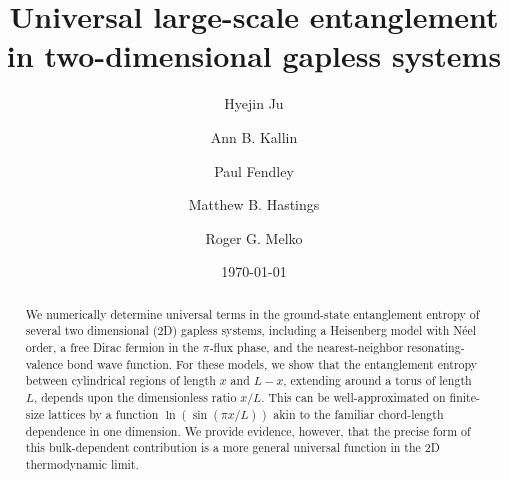\documentclass[prl,aps,twocolumn,floatfix,amsmath,amssymb,superscriptaddress,tightenlines]{revtex4}
\begin{document}
\newcommand{\be}{\begin{equation}}
\newcommand{\ee}{\end{equation}}

\date{\today}
\title{Universal large-scale entanglement in
  two-dimensional gapless systems}

\author{Hyejin Ju}

\author{Ann B. Kallin}

\author{Paul Fendley}

\author{Matthew B. Hastings}

\author{Roger G. Melko}

\begin{abstract} 
We numerically determine universal terms in the ground-state entanglement entropy of several two dimensional (2D) gapless systems, including a Heisenberg model with N\'eel order, a free Dirac fermion in the $\pi$-flux phase, and the nearest-neighbor resonating-valence bond wave function.
For these models, we show that the entanglement entropy between cylindrical
regions of length $x$ and $L-x$, extending around a torus of
length $L$, depends upon the dimensionless ratio $x/L$.  This can be well-approximated on finite-size lattices by a function
$\ln(\sin(\pi x/L))$ akin to the familiar chord-length dependence in one dimension. 
We provide evidence, however, that the precise form of this bulk-dependent contribution
is a more general universal function in the 2D thermodynamic limit.

\end{abstract}
\maketitle
\end{document}

